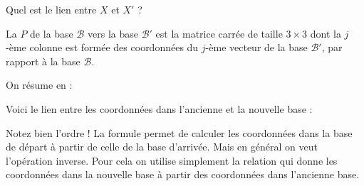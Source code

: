 \documentclass[11pt,class=report,crop=false]{standalone}
\begin{document}

Quel est le lien entre $X$ et $X'$ ?



La  $P$ de la base $\mathcal{B}$ vers la base
$\mathcal{B}'$ est la matrice carrée de taille $3 \times 3$ dont la $j$-ème colonne
est formée des coordonnées du $j$-ème vecteur de la base $\mathcal{B}'$,
par rapport à la base $\mathcal{B}$.



On résume en :

Voici le lien entre les coordonnées dans l'ancienne et la nouvelle base :
\begin{proposition}
\sauteligne
{}
\end{proposition}
Notez bien l'ordre !
La formule permet de calculer les coordonnées dans la base de départ à partir de celle de la base d'arrivée. Mais en général on veut l'opération inverse. Pour cela on utilise simplement la relation  qui donne les coordonnées dans la nouvelle base à partir des coordonnées dans l'ancienne base.
\end{document}
